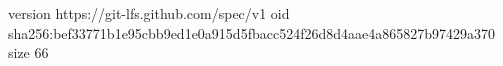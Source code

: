 version https://git-lfs.github.com/spec/v1
oid sha256:bef33771b1e95cbb9ed1e0a915d5fbacc524f26d8d4aae4a865827b97429a370
size 66

